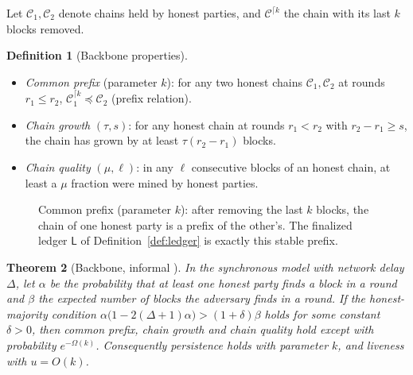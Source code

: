 \documentclass[11pt,a4paper]{article}
\newenvironment{formal}{\par\smallskip}{\par\smallskip}
\theoremstyle{definition}
\newtheorem{definition}{Definition}[section]
\theoremstyle{plain}
\newtheorem{theorem}[definition]{Theorem}
\theoremstyle{remark}
\begin{document}
\begin{formal}
Let $\mathcal C_1,\mathcal C_2$ denote chains held by honest parties, and $\mathcal C^{\lceil k}$ the chain with its last $k$ blocks removed.
\begin{definition}[Backbone properties]
\begin{itemize}[nosep]
\item \emph{Common prefix} (parameter $k$): for any two honest chains $\mathcal C_1,\mathcal C_2$ at rounds $r_1\le r_2$, $\mathcal C_1^{\lceil k}\preceq\mathcal C_2$ (prefix relation).
\item \emph{Chain growth} $(\tau,s)$: for any honest chain at rounds $r_1<r_2$ with $r_2-r_1\ge s$, the chain has grown by at least $\tau(r_2-r_1)$ blocks.
\item \emph{Chain quality} $(\mu,\ell)$: in any $\ell$ consecutive blocks of an honest chain, at least a $\mu$ fraction were mined by honest parties.
\end{itemize}
\end{definition}

\begin{figure}[htbp]
\centering
{}
\caption{Common prefix (parameter $k$): after removing the last $k$ blocks, the chain of one honest party is a prefix of the other's. The finalized ledger $\mathsf L$ of Definition~\ref{def:ledger} is exactly this stable prefix.}
\end{figure}

\begin{theorem}[Backbone, informal \cite{GKL15,PSS17}]\label{thm:backbone}
In the synchronous model with network delay $\Delta$, let $\alpha$ be the probability that at least one honest party finds a block in a round and $\beta$ the expected number of blocks the adversary finds in a round.
If the honest-majority condition $\alpha\big(1-2(\Delta+1)\alpha\big)>(1+\delta)\beta$ holds for some constant $\delta>0$, then common prefix, chain growth and chain quality hold except with probability $e^{-\Omega(k)}$.
Consequently persistence holds with parameter $k$, and liveness with $u=O(k)$.
\end{theorem}


\end{formal}
\end{document}
